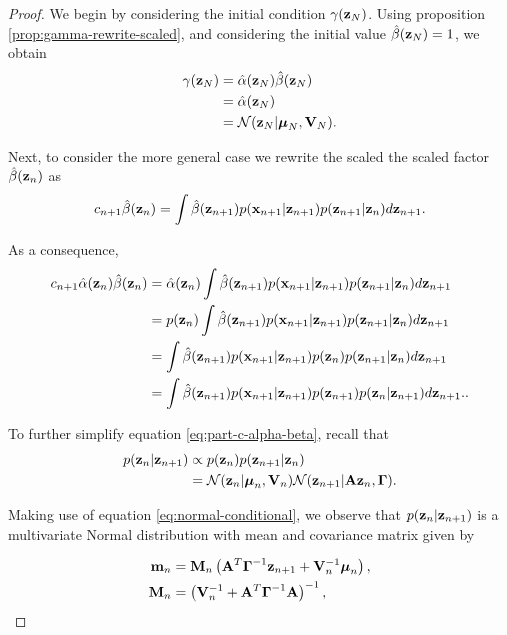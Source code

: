 \documentclass[11pt]{article}
\numberwithin{equation}{section}
\newcommand{\x}{{\bf x}}
\newcommand{\z}{{\bf z}}
\newcommand{\N}{\mathcal{N}}
\begin{document}
\begin{proof}
	We begin by considering the initial condition $\gamma(\z_N)$. Using proposition \ref{prop:gamma-rewrite-scaled}, and considering the initial value $\hat\beta(\z_N)=1$, we obtain
	\begin{align}
		\gamma(\z_N) &= \hat\alpha(\z_N)\hat\beta(\z_N)\\
					 &= \hat\alpha(\z_N)\\
					 &= \N(\z_N \vert \boldsymbol\mu_N, {\bf V}_N).
	\end{align}

	Next, to consider the more general case we rewrite the scaled the scaled factor $\hat\beta(\z_n)$ as
	\begin{equation}
		c_{n+1} \hat\beta(\z_n) = \int \hat\beta(\z_{n+1}) p(\x_{n+1} \vert \z_{n+1}) p(\z_{n+1} \vert \z_n) d\z_{n+1}.
	\end{equation}
	
	As a consequence,	
	\begin{align}
		c_{n+1}\hat\alpha(\z_n)\hat\beta(\z_n) &= \hat\alpha(\z_n) \int \hat\beta(\z_{n+1}) p(\x_{n+1} \vert \z_{n+1}) p(\z_{n+1} \vert \z_n) d\z_{n+1}\\
		&= p(\z_n)\int \hat\beta(\z_{n+1}) p(\x_{n+1}\vert \z_{n+1})p(\z_{n+1}\vert \z_n) d\z_{n+1}\\
		&= \int \hat\beta(\z_{n+1}) p(\x_{n+1}\vert \z_{n+1}) p(\z_n) p(\z_{n+1}\vert \z_n) d\z_{n+1}\\
		&= \int \hat\beta(\z_{n+1 }) p(\x_{n+1}\vert \z_{n+1}) p(\z_{n+1}) p(\z_{n}\vert \z_{n+1}) d\z_{n+1}. \label{eq:part-c-alpha-beta}.
	\end{align}
	
	To further simplify equation \eqref{eq:part-c-alpha-beta}, recall that
	\begin{align}
		p(\z_n\vert \z_{n+1}) &\propto p(\z_n) p(\z_{n+1} \vert \z_n) \\
		&= \N(\z_n \vert\boldsymbol\mu_n, {\bf V}_n) \N(\z_{n+1} \vert {\bf A}\z_n, \boldsymbol\Gamma).
	\end{align}
	
	Making use of equation \eqref{eq:normal-conditional}, we observe that $p(\z_n \vert \z_{n+1})$ is a multivariate Normal distribution with mean and covariance matrix given by
	
	\begin{align}
		{\bf m}_n &= {\bf M}_n \left({\bf A}^T\boldsymbol\Gamma^{-1}\z_{n+1} + {\bf V}_n^{-1}\boldsymbol\mu_n\right),\\
		{\bf M}_n &= \left( {\bf V}_n^{-1}  + {\bf A}^T\boldsymbol{\Gamma}^{-1}{\bf A} \right)^{-1},
	\end{align}
	

\end{proof}
\end{document}
